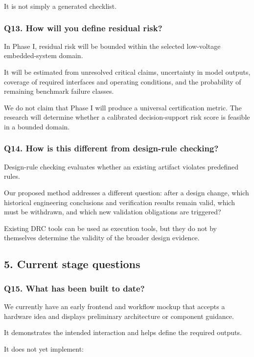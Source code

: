 \documentclass[12pt,letterpaper]{article}
\begin{document}
It is not simply a generated checklist.

\subsubsection{Q13. How will you define residual risk?}

In Phase I, residual risk will be bounded within the selected low-voltage embedded-system domain.

It will be estimated from unresolved critical claims, uncertainty in model outputs, coverage of required interfaces and operating conditions, and the probability of remaining benchmark failure classes.

We do not claim that Phase I will produce a universal certification metric. The research will determine whether a calibrated decision-support risk score is feasible in a bounded domain.

\subsubsection{Q14. How is this different from design-rule checking?}

Design-rule checking evaluates whether an existing artifact violates predefined rules.

Our proposed method addresses a different question: after a design change, which historical engineering conclusions and verification results remain valid, which must be withdrawn, and which new validation obligations are triggered?

Existing DRC tools can be used as execution tools, but they do not by themselves determine the validity of the broader design evidence.

\subsection{5. Current stage questions}
\subsubsection{Q15. What has been built to date?}

We currently have an early frontend and workflow mockup that accepts a hardware idea and displays preliminary architecture or component guidance.

It demonstrates the intended interaction and helps define the required outputs.

It does not yet implement:
\end{document}

